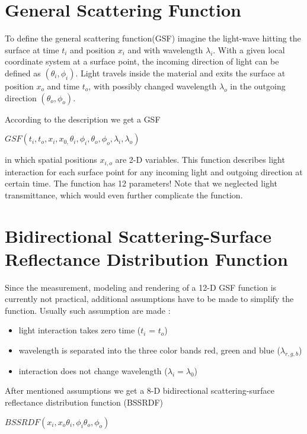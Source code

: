 \section{General Scattering Function}
\label{section:grf}
 
To define the general scattering function(GSF) imagine the light-wave hitting the surface at time $t_{i}$ and position $x_{i}$ and with wavelength $\lambda_{i}$\cite{star2004}.
 With a given local coordinate system at a surface point, the incoming direction of light can be defined as $(\theta_{i} ,\phi_{i})$.
 Light travels inside the material and exits the surface at position $x_{o}$ and time $t_{o}$, with possibly changed wavelength $\lambda_{o}$ in the outgoing direction $(\theta_{o} ,\phi_{o})$.
  
According to the description we get a GSF
 \begin{center} 
$GSF(t_{i},t_{o},x_{i},x_{0,}\theta_{i} ,\phi_{i},\theta_{o},\phi_{o},\lambda_{i},\lambda_{o})$
 \end{center}
in which  spatial positions $x_{i,o}$ are 2-D variables.
This function describes light interaction for each surface point for any incoming light and outgoing direction at certain time.
The function has 12 parameters! Note that we neglected light transmittance, which would even further complicate the function.


\section{Bidirectional Scattering-Surface Reflectance Distribution Function}
\label{section:BSSRDF}
 Since the measurement, modeling and rendering of a 12-D GSF function is currently not practical, additional assumptions have to be made to simplify the function.
 Usually such assumption are made \cite{star2004}:

\begin{itemize}
 \item light interaction takes zero time ($t_{i}$  = $t_{o}$)
 \item wavelength is separated into the three color bands red, green and blue ($\lambda_{r,g,b}$)
 \item interaction does not change wavelength ($\lambda_{i}= \lambda_{0}$)
\end{itemize}

After mentioned assumptions we get a 8-D bidirectional scattering-surface reflectance distribution function (BSSRDF)
 \begin{center}
$BSSRDF(x_{i},x_{o}\theta_{i} ,\phi_{i}\theta_{o} ,\phi_{o})$
 \end{center}


